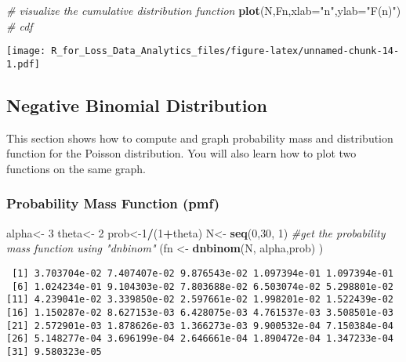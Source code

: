 \documentclass[]{book}
\newenvironment{Shaded}{\begin{snugshade}}{\end{snugshade}}
\newcommand{\KeywordTok}[1]{\textcolor[rgb]{0.13,0.29,0.53}{\textbf{#1}}}
\newcommand{\DataTypeTok}[1]{\textcolor[rgb]{0.13,0.29,0.53}{#1}}
\newcommand{\DecValTok}[1]{\textcolor[rgb]{0.00,0.00,0.81}{#1}}
\newcommand{\StringTok}[1]{\textcolor[rgb]{0.31,0.60,0.02}{#1}}
\newcommand{\CommentTok}[1]{\textcolor[rgb]{0.56,0.35,0.01}{\textit{#1}}}
\newcommand{\OperatorTok}[1]{\textcolor[rgb]{0.81,0.36,0.00}{\textbf{#1}}}
\newcommand{\NormalTok}[1]{#1}
\theoremstyle{definition}
\theoremstyle{definition}
\theoremstyle{definition}
\theoremstyle{remark}
\begin{document}
\begin{Shaded}
\begin{Highlighting}[]
\CommentTok{# visualize the cumulative distribution function}
\KeywordTok{plot}\NormalTok{(N,Fn,}\DataTypeTok{xlab=}\StringTok{"n"}\NormalTok{,}\DataTypeTok{ylab=}\StringTok{"F(n)"}\NormalTok{) }\CommentTok{# cdf}
\end{Highlighting}
\end{Shaded}

\texttt{[image: R\_for\_Loss\_Data\_Analytics\_files/figure-latex/unnamed-chunk-14-1.pdf]}

\subsection{Negative Binomial
Distribution}\label{negative-binomial-distribution}

This section shows how to compute and graph probability mass and
distribution function for the Poisson distribution. You will also learn
how to plot two functions on the same graph.

\subsubsection{Probability Mass Function
(pmf)}\label{probability-mass-function-pmf-1}

\begin{Shaded}
\begin{Highlighting}[]
\NormalTok{alpha<-}\StringTok{ }\DecValTok{3}
\NormalTok{theta<-}\StringTok{ }\DecValTok{2}
\NormalTok{prob<-}\DecValTok{1}\OperatorTok{/}\NormalTok{(}\DecValTok{1}\OperatorTok{+}\NormalTok{theta)}
\NormalTok{N<-}\StringTok{ }\KeywordTok{seq}\NormalTok{(}\DecValTok{0}\NormalTok{,}\DecValTok{30}\NormalTok{, }\DecValTok{1}\NormalTok{)}
\CommentTok{#get the probability mass function using "dnbinom"}
\NormalTok{(fn <-}\StringTok{ }\KeywordTok{dnbinom}\NormalTok{(N, alpha,prob) )}
\end{Highlighting}
\end{Shaded}

\begin{verbatim}
 [1] 3.703704e-02 7.407407e-02 9.876543e-02 1.097394e-01 1.097394e-01
 [6] 1.024234e-01 9.104303e-02 7.803688e-02 6.503074e-02 5.298801e-02
[11] 4.239041e-02 3.339850e-02 2.597661e-02 1.998201e-02 1.522439e-02
[16] 1.150287e-02 8.627153e-03 6.428075e-03 4.761537e-03 3.508501e-03
[21] 2.572901e-03 1.878626e-03 1.366273e-03 9.900532e-04 7.150384e-04
[26] 5.148277e-04 3.696199e-04 2.646661e-04 1.890472e-04 1.347233e-04
[31] 9.580323e-05
\end{verbatim}
\end{document}

